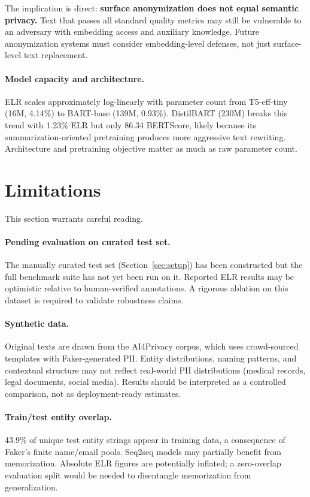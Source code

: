 \documentclass[10pt,twocolumn]{article}
\begin{document}
The implication is direct: \textbf{surface anonymization does not equal semantic privacy.}
Text that passes all standard quality metrics may still be vulnerable to an adversary with embedding access and auxiliary knowledge.
Future anonymization systems must consider embedding-level defenses, not just surface-level text replacement.

\paragraph{Model capacity and architecture.}
ELR scales approximately log-linearly with parameter count from T5-eff-tiny (16M, 4.14\%) to BART-base (139M, 0.93\%).
DistilBART (230M) breaks this trend with 1.23\% ELR but only 86.34 BERTScore, likely because its summarization-oriented pretraining produces more aggressive text rewriting.
Architecture and pretraining objective matter as much as raw parameter count.

\section{Limitations}\label{sec:limitations}

This section warrants careful reading.

\paragraph{Pending evaluation on curated test set.}
The manually curated test set (Section~\ref{sec:setup}) has been constructed but the full benchmark suite has not yet been run on it.
Reported ELR results may be optimistic relative to human-verified annotations.
A rigorous ablation on this dataset is required to validate robustness claims.

\paragraph{Synthetic data.}
Original texts are drawn from the AI4Privacy corpus, which uses crowd-sourced templates with Faker-generated PII.
Entity distributions, naming patterns, and contextual structure may not reflect real-world PII distributions (medical records, legal documents, social media).
Results should be interpreted as a controlled comparison, not as deployment-ready estimates.

\paragraph{Train/test entity overlap.}
43.9\% of unique test entity strings appear in training data, a consequence of Faker's finite name/email pools.
Seq2seq models may partially benefit from memorization.
Absolute ELR figures are potentially inflated; a zero-overlap evaluation split would be needed to disentangle memorization from generalization.
\end{document}
